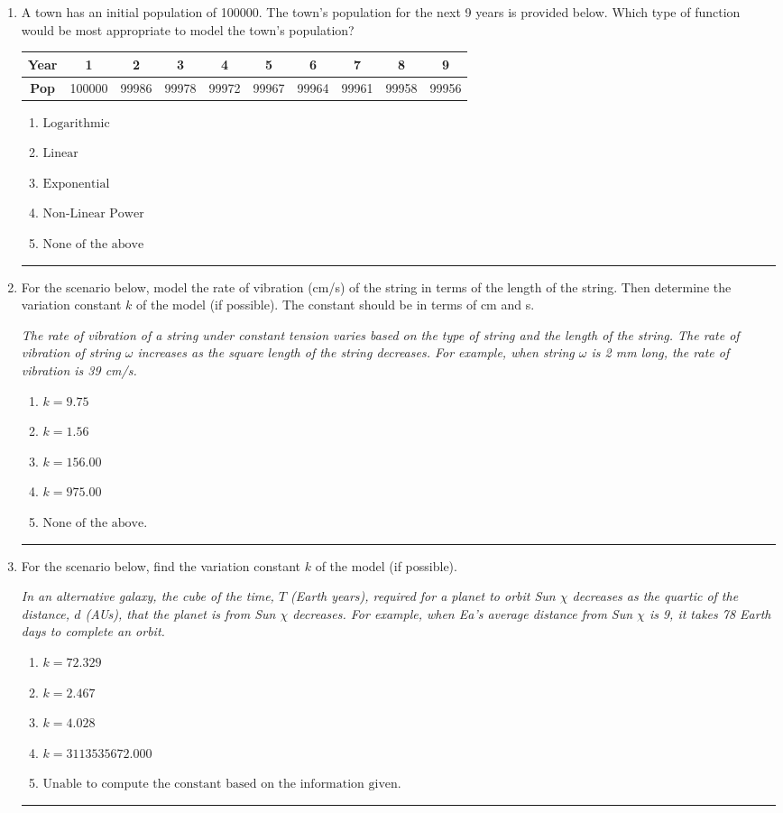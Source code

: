 \documentclass[14pt]{extbook}
\newcommand{\litem}[1]{\item#1\hspace*{-1cm}\rule{\textwidth}{0.4pt}}
\begin{document}
\begin{enumerate}
{\begin{enumerate}[label=\Alph*.]
\end{enumerate} }
\litem{
A town has an initial population of 100000. The town's population for the next 9 years is provided below. Which type of function would be most appropriate to model the town's population?

\begin{tabular}{c|c|c|c|c|c|c|c|c|c}
\textbf{Year} &1 &2 &3 &4 &5 &6 &7 &8 &9\tabularnewline \hline
\textbf{Pop} &100000 &99986 &99978 &99972 &99967 &99964 &99961 &99958 &99956\end{tabular}\begin{enumerate}[label=\Alph*.]
\item \( \text{Logarithmic} \)
\item \( \text{Linear} \)
\item \( \text{Exponential} \)
\item \( \text{Non-Linear Power} \)
\item \( \text{None of the above} \)

\end{enumerate} }
\litem{
For the scenario below, model the rate of vibration (cm/s) of the string in terms of the length of the string. Then determine the variation constant $k$ of the model (if possible). The constant should be in terms of cm and s.
\begin{center}
    \textit{ The rate of vibration of a string under constant tension varies based on the type of string and the length of the string. The rate of vibration of string $\omega$ increases as the square length of the string decreases. For example, when string $\omega$ is 2 mm long, the rate of vibration is 39 cm/s. }
\end{center}
\begin{enumerate}[label=\Alph*.]
\item \( k = 9.75 \)
\item \( k = 1.56 \)
\item \( k = 156.00 \)
\item \( k = 975.00 \)
\item \( \text{None of the above.} \)

\end{enumerate} }
\litem{
For the scenario below, find the variation constant $k$ of the model (if possible).
\begin{center}
    \textit{ In an alternative galaxy, the cube of the time, $T$ (Earth years), required for a planet to orbit Sun $\chi$ decreases as the quartic of the distance, $d$ (AUs), that the planet is from Sun $\chi$ decreases. For example, when Ea's average distance from Sun $\chi$ is 9, it takes 78 Earth days to complete an orbit. }
\end{center}
\begin{enumerate}[label=\Alph*.]
\item \( k = 72.329 \)
\item \( k = 2.467 \)
\item \( k = 4.028 \)
\item \( k = 3113535672.000 \)
\item \( \text{Unable to compute the constant based on the information given.} \)


\end{enumerate}}
\end{enumerate}
\end{document}
